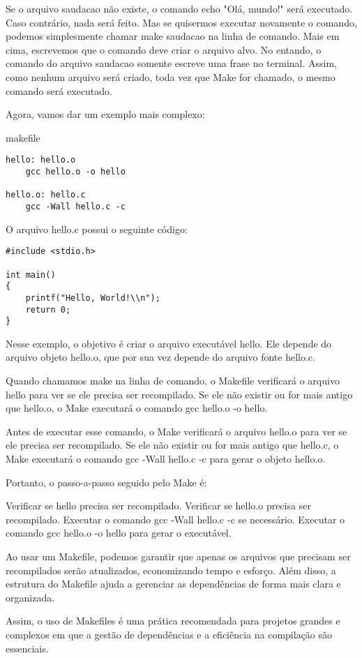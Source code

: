 Se o arquivo saudacao não existe, o comando echo "Olá, mundo!" será executado. Caso contrário, nada será feito. Mas se quisermos executar novamente o comando, podemos simplesmente chamar make saudacao na linha de comando. Mais em cima, escrevemos que o comando deve criar o arquivo alvo. No entando, o comando do arquivo saudacao somente escreve uma frase no terminal. Assim, como nenhum arquivo será criado, toda vez que Make for chamado, o mesmo comando será executado.

Agora, vamos dar um exemplo mais complexo:

makefile

\begin{scriptsize}
\estilobash
\begin{lstlisting}
hello: hello.o
    gcc hello.o -o hello

hello.o: hello.c
    gcc -Wall hello.c -c
\end{lstlisting}
\end{scriptsize}

O arquivo hello.c possui o seguinte código:

\begin{scriptsize}
\estiloC
\begin{lstlisting}[title=hello.c]
#include <stdio.h>

int main()
{
    printf("Hello, World!\\n");
    return 0;
}
\end{lstlisting}
\end{scriptsize}



Nesse exemplo, o objetivo é criar o arquivo executável hello. Ele depende do arquivo objeto hello.o, que por sua vez depende do arquivo fonte hello.c.

Quando chamamos make na linha de comando, o Makefile verificará o arquivo hello para ver se ele precisa ser recompilado. Se ele não existir ou for mais antigo que hello.o, o Make executará o comando gcc hello.o -o hello.

Antes de executar esse comando, o Make verificará o arquivo hello.o para ver se ele precisa ser recompilado. Se ele não existir ou for mais antigo que hello.c, o Make executará o comando gcc -Wall hello.c -c para gerar o objeto hello.o.

Portanto, o passo-a-passo seguido pelo Make é:


    Verificar se hello precisa ser recompilado.
    Verificar se hello.o precisa ser recompilado.
    Executar o comando gcc -Wall hello.c -c se necessário.
    Executar o comando gcc hello.o -o hello para gerar o executável.


Ao usar um Makefile, podemos garantir que apenas os arquivos que precisam ser recompilados serão atualizados, economizando tempo e esforço. Além disso, a estrutura do Makefile ajuda a gerenciar as dependências de forma mais clara e organizada.

Assim, o uso de Makefiles é uma prática recomendada para projetos grandes e complexos em que a gestão de dependências e a eficiência na compilação são essenciais.